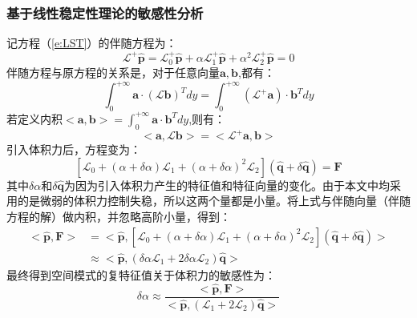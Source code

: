 \subsubsection{基于线性稳定性理论的敏感性分析}
记方程（\ref{e:LST}）的伴随方程为：
\begin{equation}\label{e:aLST}
  \mathscr{L}^+\hat{\mathbf{p}}=\mathscr{L}_0^+\hat{\mathbf{p}}+\alpha \mathscr{L}_1^+\hat{\mathbf{p}} + \alpha^2\mathscr{L}_2^+\hat{\mathbf{p}}=0
\end{equation}
伴随方程与原方程的关系是，对于任意向量$\mathbf{a},\mathbf{b}$,都有：
\begin{equation}
    \int_{0}^{+\infty}\mathbf{a}\cdot(\mathscr{L}\mathbf{b})^Tdy=\int_{0}^{+\infty}(\mathscr{L}^+\mathbf{a})\cdot\mathbf{b}^Tdy
\end{equation}
若定义内积$<\mathbf{a},\mathbf{b}>=\int_{0}^{+\infty}\mathbf{a}\cdot\mathbf{b}^Tdy$,则有：
\begin{equation}
  <\mathbf{a},\mathscr{L}\mathbf{b}> = <\mathscr{L}^+\mathbf{a},\mathbf{b}>
\end{equation}
引入体积力后，方程变为：
\begin{equation}\label{}
  \left[\mathscr{L}_0+(\alpha + \delta\alpha) \mathscr{L}_1 + (\alpha + \delta\alpha)^2\mathscr{L}_2\right](\hat{\mathbf{q}}+\delta\hat{\mathbf{q}})=\mathbf{F}
\end{equation}
其中$\delta\alpha$和$\delta\hat{\mathbf{q}}$为因为引入体积力产生的特征值和特征向量的变化。由于本文中均采用的是微弱的体积力控制失稳，所以这两个量都是小量。将上式与伴随向量（伴随方程的解）做内积，并忽略高阶小量，得到：
\begin{equation}\label{}
  \begin{aligned}
    <\hat{\mathbf{p}},\mathbf{F}> &= <\hat{\mathbf{p}},\left[\mathscr{L}_0+(\alpha + \delta\alpha) \mathscr{L}_1 + (\alpha + \delta\alpha)^2\mathscr{L}_2\right](\hat{\mathbf{q}}+\delta\hat{\mathbf{q}})> \\
    &\approx  <\hat{\mathbf{p}},(\delta\alpha \mathscr{L}_1+2\delta\alpha\mathscr{L}_2)\hat{\mathbf{q}}>
  \end{aligned}
\end{equation}
最终得到空间模式的复特征值关于体积力的敏感性为：
\begin{equation}\label{e:LST_adjoint}
  \delta\alpha \approx \frac{<\hat{\mathbf{p}},\mathbf{F}>}{<\hat{\mathbf{p}},( \mathscr{L}_1+2\mathscr{L}_2)\hat{\mathbf{q}}>}
\end{equation}
